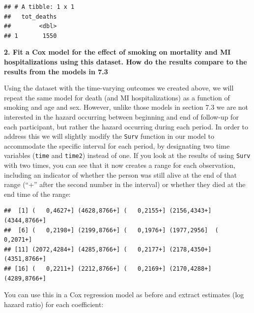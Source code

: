 \documentclass[
]{book}
\newenvironment{Shaded}{\begin{snugshade}}{\end{snugshade}}
\newcommand{\DataTypeTok}[1]{\textcolor[rgb]{0.13,0.29,0.53}{#1}}
\newcommand{\DecValTok}[1]{\textcolor[rgb]{0.00,0.00,0.81}{#1}}
\newcommand{\KeywordTok}[1]{\textcolor[rgb]{0.13,0.29,0.53}{\textbf{#1}}}
\newcommand{\NormalTok}[1]{#1}
\newcommand{\OperatorTok}[1]{\textcolor[rgb]{0.81,0.36,0.00}{\textbf{#1}}}
\newcommand{\StringTok}[1]{\textcolor[rgb]{0.31,0.60,0.02}{#1}}
\begin{document}
\begin{verbatim}
## # A tibble: 1 x 1
##   tot_deaths
##        <dbl>
## 1       1550
\end{verbatim}

\textbf{2. Fit a Cox model for the effect of smoking on mortality and MI hospitalizations using this dataset. How do the results compare to the results from the models in 7.3}

Using the dataset with the time-varying outcomes we created above, we will repeat the same model for death (and MI hospitalizations) as a function of smoking and age and sex. However, unlike those models in section 7.3 we are not interested in the hazard occurring between beginning and end of follow-up for each participant, but rather the hazard occurring during each period. In order to address this we will slightly modify the \texttt{Surv} function in our model to accommodate the specific interval for each period, by designating two time variables (\texttt{time} and \texttt{time2}) instead of one. If you look at the results of using \texttt{Surv} with two times, you can see that it now creates a range for each observation, including an indicator of whether the person was still alive at the end of that range (``+'' after the second number in the interval) or whether they died at the end time of the range:

\begin{Shaded}
\end{Shaded}

\begin{verbatim}
##  [1] (   0,4627+] (4628,8766+] (   0,2155+] (2156,4343+] (4344,8766+]
##  [6] (   0,2198+] (2199,8766+] (   0,1976+] (1977,2956]  (   0,2071+]
## [11] (2072,4284+] (4285,8766+] (   0,2177+] (2178,4350+] (4351,8766+]
## [16] (   0,2211+] (2212,8766+] (   0,2169+] (2170,4288+] (4289,8766+]
\end{verbatim}

You can use this in a Cox regression model as before and extract estimates (log hazard ratio) for each coefficient:

\begin{Shaded}
\end{Shaded}
\end{document}
